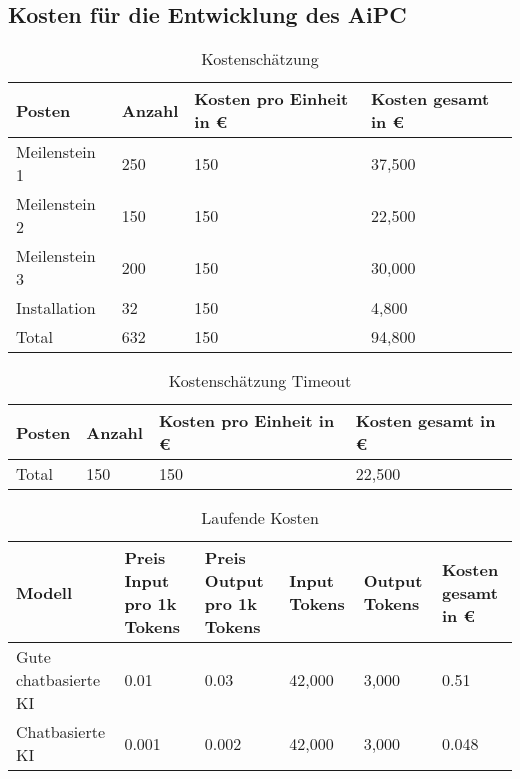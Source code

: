 \subsection{Kosten für die Entwicklung des AiPC}\label{subsec:kosten-fuer-die-entwicklung-des-aipc}
\begin{table}[H]
    \begin{tabularx}{\textwidth}{XXXX}
        \toprule
        \textbf{Posten} & \textbf{Anzahl} & \textbf{Kosten pro Einheit in €} & \textbf{Kosten gesamt in €} \\
        \midrule
        Meilenstein 1 & 250 & 150 & 37,500 \\
        Meilenstein 2 & 150 & 150 & 22,500 \\
        Meilenstein 3 & 200 & 150 & 30,000 \\
        Installation & 32 & 150 & 4,800 \\
        \bottomrule
        Total & 632 & 150 & 94,800 \\
        \bottomrule
    \end{tabularx}
    \caption{Kostenschätzung}
    \label{tab:kosten}
\end{table}

\begin{table}[H]
    \begin{tabularx}{\textwidth}{XXXX}
        \toprule
        \textbf{Posten} & \textbf{Anzahl} & \textbf{Kosten pro Einheit in €} & \textbf{Kosten gesamt in €} \\
        \midrule
        Total           & 150             & 150                              & 22,500                      \\
        \bottomrule
    \end{tabularx}
    \caption{Kostenschätzung Timeout}
    \label{tab:kosten-timeout}
\end{table}

\begin{table}[H]
    \begin{tabularx}{\textwidth}{XXXXXX}
        \toprule
        \textbf{Modell}      & \textbf{Preis Input pro 1k Tokens} & \textbf{Preis Output pro 1k Tokens} & \textbf{Input Tokens} & \textbf{Output Tokens}& \textbf{Kosten gesamt in €} \\
        \midrule
        Gute chatbasierte KI & 0.01                               & 0.03                                & 42,000                & 3,000                  & 0.51                        \\
        Chatbasierte KI      & 0.001                              & 0.002                               & 42,000                & 3,000                  & 0.048                       \\
        \bottomrule
    \end{tabularx}
    \caption{Laufende Kosten}
    \label{tab:kosten-laufend}
\end{table}


